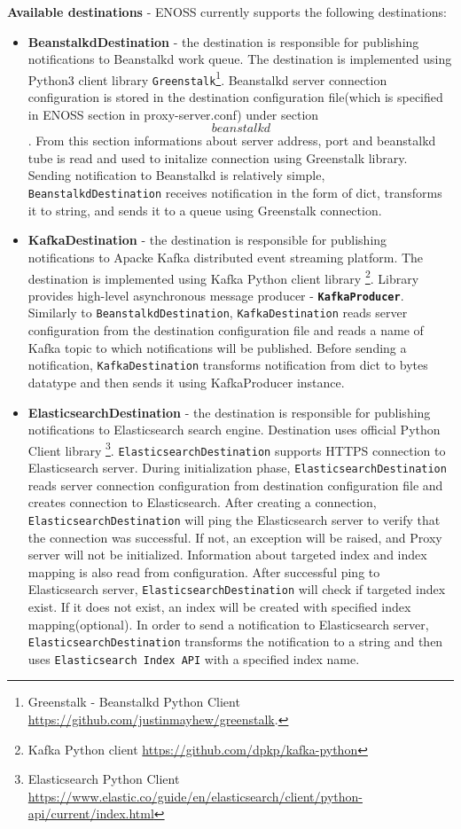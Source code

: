     \textbf{Available destinations} - ENOSS currently supports the following destinations:
    \begin{itemize}
        \item \textbf{BeanstalkdDestination} - the destination is responsible for publishing notifications to Beanstalkd work queue. The destination is implemented using Python3 client library \texttt{Greenstalk}\footnote{Greenstalk - Beanstalkd Python Client \url{https://github.com/justinmayhew/greenstalk}.}. Beanstalkd server connection configuration is stored in the destination configuration file(which is specified in ENOSS section in proxy-server.conf) under section \texttt{\[beanstalkd\]}. From this section informations about server address, port and beanstalkd tube is read and used to initalize connection using Greenstalk library. Sending notification to Beanstalkd is relatively simple, \texttt{BeanstalkdDestination} receives notification in the form of dict, transforms it to string, and sends it to a queue using Greenstalk connection.

        \item \textbf{KafkaDestination} - the destination is responsible for publishing notifications to Apacke Kafka distributed event streaming platform. The destination is implemented using Kafka Python client library \footnote{Kafka Python client \url{https://github.com/dpkp/kafka-python}}. Library provides high-level asynchronous message producer - \textbf{\texttt{KafkaProducer}}. Similarly to \texttt{BeanstalkdDestination}, \texttt{KafkaDestination} reads server configuration from the destination configuration file and reads a name of Kafka topic to which notifications will be published. Before sending a notification, \texttt{KafkaDestination} transforms notification from dict to bytes datatype and then sends it using KafkaProducer instance.

        \item \textbf{ElasticsearchDestination} - the destination is responsible for publishing notifications to Elasticsearch search engine. Destination uses official Python Client library \footnote{Elasticsearch Python Client \url{https://www.elastic.co/guide/en/elasticsearch/client/python-api/current/index.html}}. \texttt{ElasticsearchDestination} supports HTTPS connection to Elasticsearch server. During initialization phase, \texttt{ElasticsearchDestination} reads server connection configuration from destination configuration file and creates connection to Elasticsearch. After creating a connection, \texttt{ElasticsearchDestination} will ping the Elasticsearch server to verify that the connection was successful. If not, an exception will be raised, and Proxy server will not be initialized. Information about targeted index and index mapping is also read from configuration. After successful ping to Elasticsearch server, \texttt{ElasticsearchDestination} will check if targeted index exist. If it does not exist, an index will be created with specified index mapping(optional). In order to send a notification to Elasticsearch server, \texttt{ElasticsearchDestination} transforms the notification to a string and then uses \texttt{Elasticsearch Index API} with a specified index name.
    \end{itemize}

